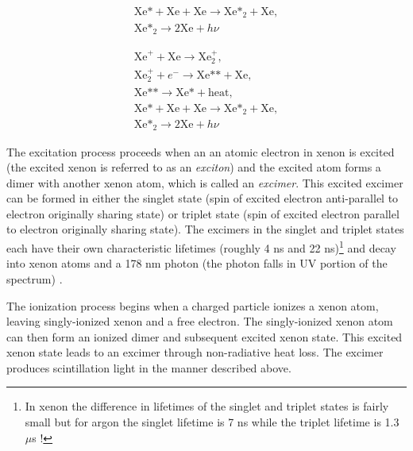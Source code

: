 \begin{equation}
        \label{eqn:exciton_production}
        \begin{gathered}
                \textrm{Xe*} + \textrm{Xe} + \textrm{Xe} \rightarrow \textrm{Xe*}_2 + \textrm{Xe}, \\
                \textrm{Xe*}_2 \rightarrow 2\textrm{Xe} + h \nu
        \end{gathered}
\end{equation}


\begin{equation}
        \label{eqn:ionization_production}
        \begin{gathered}
                \textrm{Xe}^+ + \textrm{Xe} \rightarrow \textrm{Xe}_2^+, \\
                \textrm{Xe}_2^+ + e^- \rightarrow \textrm{Xe**} + \textrm{Xe}, \\
                \textrm{Xe**} \rightarrow \textrm{Xe*} + \textrm{heat}, \\
                \textrm{Xe*} + \textrm{Xe} + \textrm{Xe} \rightarrow \textrm{Xe*}_2 + \textrm{Xe}, \\
                \textrm{Xe*}_2 \rightarrow 2\textrm{Xe} + h \nu
        \end{gathered}
\end{equation}

The excitation process proceeds when an an atomic electron in xenon is excited (the excited xenon is referred to as an \textit{exciton}) and the excited atom forms a dimer with another xenon atom, which is called an \textit{excimer}.  This excited excimer can be formed in either the singlet state (spin of excited electron anti-parallel to electron originally sharing state) or triplet state (spin of excited electron parallel to electron originally sharing state).  The excimers in the singlet and triplet states each have their own characteristic lifetimes (roughly 4 ns and 22 ns)\footnote{In xenon the difference in lifetimes of the singlet and triplet states is fairly small but for argon the singlet lifetime is 7 ns while the triplet lifetime is 1.3 $\mu$s \cite{heindl2011table}!} and decay into xenon atoms and a 178 nm photon (the photon falls in UV portion of the spectrum) \cite{hitachi1983effect, doke2002absolute}.  

The ionization process begins when a charged particle ionizes a xenon atom, leaving singly-ionized xenon and a free electron.  The singly-ionized xenon atom can then form an ionized dimer and subsequent excited xenon state.  This excited xenon state leads to an excimer through non-radiative heat loss.  The excimer produces scintillation light in the manner described above.

